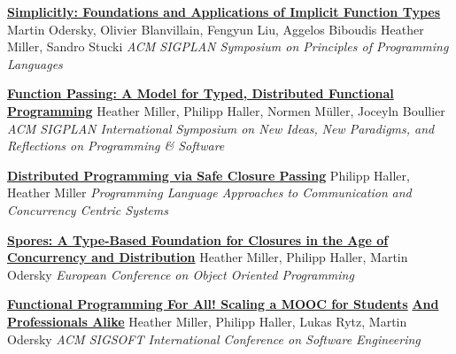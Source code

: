 \documentclass[9pt]{article}
\begin{document}
\noindent\href{https://infoscience.epfl.ch/record/229878}{\bf Simplicitly: Foundations and Applications of Implicit Function Types}
\newline\noindent Martin Odersky, Olivier Blanvillain, Fengyun Liu, Aggelos Biboudis
\newline\noindent Heather Miller, Sandro Stucki
\newline\noindent\emph{ACM SIGPLAN Symposium on Principles of Programming Languages}
\bigskip

\noindent\href{https://infoscience.epfl.ch/record/205822}{\bf Function Passing: A Model for Typed, Distributed Functional}
\newline\noindent\href{https://infoscience.epfl.ch/record/205822}{\bf Programming}
\newline\noindent Heather Miller, Philipp Haller, Normen M\"{u}ller, Joceyln Boullier
\newline\noindent\emph{ACM SIGPLAN International Symposium on New Ideas, }
\newline\noindent\emph{New Paradigms, and Reflections on Programming \& Software}
\bigskip

\noindent\href{https://infoscience.epfl.ch/record/205039}{\bf Distributed Programming via Safe Closure Passing}
\newline\noindent Philipp Haller, Heather Miller
\newline\noindent\emph{Programming Language Approaches to Communication}
\newline\noindent\emph{and Concurrency Centric Systems}
\bigskip

\noindent\href{http://infoscience.epfl.ch/record/191239}{\bf Spores: A Type-Based Foundation for Closures in the Age of}\vspace{-0.03in}
\newline\noindent\href{http://infoscience.epfl.ch/record/191239}{\bf Concurrency and Distribution}
\newline\noindent Heather Miller, Philipp Haller, Martin Odersky
\newline\noindent\emph{European Conference on Object Oriented Programming}
\bigskip

\noindent\href{http://infoscience.epfl.ch/record/190022}{\bf Functional Programming For All! Scaling a MOOC for Students}\vspace{-0.03in}
\newline\noindent\href{http://infoscience.epfl.ch/record/190022}{\bf And Professionals Alike}
\newline\noindent Heather Miller, Philipp Haller, Lukas Rytz, Martin Odersky
\newline\noindent\emph{ACM SIGSOFT International Conference on Software Engineering}
\bigskip
\end{document}
